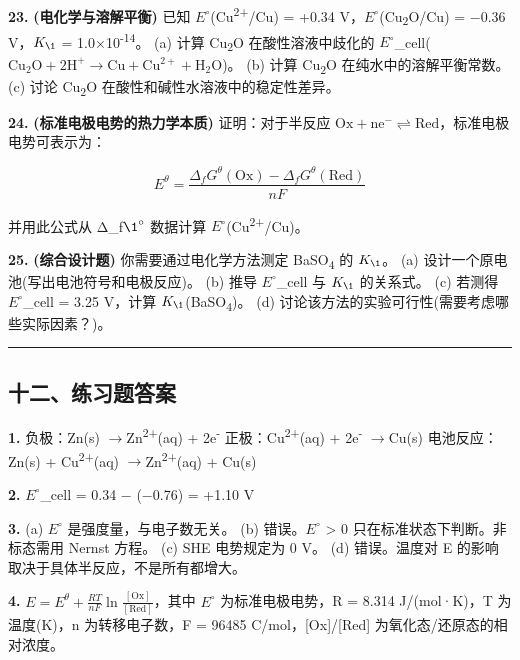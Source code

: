 \documentclass[a4paper,11pt]{ctexart}
\newcommand{\箭}{\ensuremath{\rightarrow}}
\newcommand{\左箭}{\ensuremath{\leftarrow}}
\newcommand{\上箭}{\ensuremath{\uparrow}}
\newcommand{\下箭}{\ensuremath{\downarrow}}
\newcommand{\衡}{\ensuremath{\rightleftharpoons}}
\newcommand{\双箭}{\ensuremath{\leftrightarrow}}
\newcommand{\约等于}{\ensuremath{\approx}}
\newcommand{\小于等于}{\ensuremath{\leq}}
\newcommand{\大于等于}{\ensuremath{\geq}}
\newcommand{\不等于}{\ensuremath{\neq}}
\newcommand{\西格马}{\ensuremath{\sigma}}
\newcommand{\派}{\ensuremath{\pi}}
\begin{document}
\textbf{23.} \textbf{(电化学与溶解平衡)} 已知 \(E^{\circ}\)(Cu\textsuperscript{2+}/Cu) = +0.34 V，\(E^{\circ}\)(Cu\textsubscript{2}O/Cu) = −0.36 V，\(K_{\1}\) = 1.0×10\textsuperscript{-14}。
(a) 计算 Cu\textsubscript{2}O 在酸性溶液中歧化的 \(E^{\circ}\)\_cell(\(\mathrm{Cu_2O + 2H^+ \to Cu + Cu^{2+} + H_2O}\))。
(b) 计算 Cu\textsubscript{2}O 在纯水中的溶解平衡常数。
(c) 讨论 Cu\textsubscript{2}O 在酸性和碱性水溶液中的稳定性差异。

\textbf{24.} \textbf{(标准电极电势的热力学本质)} 证明：对于半反应 \(\mathrm{Ox + ne^- \rightleftharpoons Red}\)，标准电极电势可表示为：

\[E^\theta = \frac{\Delta_f G^\theta(\mathrm{Ox}) - \Delta_f G^\theta(\mathrm{Red})}{nF}\]

并用此公式从 Δ\_f\(\1^{\circ}\) 数据计算 \(E^{\circ}\)(Cu\textsuperscript{2+}/Cu)。

\textbf{25.} \textbf{(综合设计题)} 你需要通过电化学方法测定 BaSO\textsubscript{4} 的 \(K_{\1}\)。
(a) 设计一个原电池(写出电池符号和电极反应)。
(b) 推导 \(E^{\circ}\)\_cell 与 \(K_{\1}\) 的关系式。
(c) 若测得 \(E^{\circ}\)\_cell = 3.25 V，计算 \(K_{\1}\)(BaSO\textsubscript{4})。
(d) 讨论该方法的实验可行性(需要考虑哪些实际因素？)。

\begin{center}\rule{0.5\linewidth}{0.5pt}\end{center}

\subsection{十二、练习题答案}\label{ux5341ux4e8cux7ec3ux4e60ux9898ux7b54ux6848}

\textbf{1.}
负极：Zn(s) \箭 Zn\textsuperscript{2+}(aq) + 2e\textsuperscript{-}
正极：Cu\textsuperscript{2+}(aq) + 2e\textsuperscript{-} \箭 Cu(s)
电池反应：Zn(s) + Cu\textsuperscript{2+}(aq) \箭 Zn\textsuperscript{2+}(aq) + Cu(s)

\textbf{2.} \(E^{\circ}\)\_cell = 0.34 − (−0.76) = +1.10 V

\textbf{3.}
(a) \(E^{\circ}\) 是强度量，与电子数无关。
(b) 错误。\(E^{\circ}\) \textgreater{} 0 只在标准状态下判断。非标态需用 Nernst 方程。
(c) SHE 电势规定为 0 V。
(d) 错误。温度对 E 的影响取决于具体半反应，不是所有都增大。

\textbf{4.} \(E = E^\theta + \frac{RT}{nF}\ln\frac{[\mathrm{Ox}]}{[\mathrm{Red}]}\)，其中 \(E^{\circ}\) 为标准电极电势，R = 8.314 J/(mol·K)，T 为温度(K)，n 为转移电子数，F = 96485 C/mol，{[}Ox{]}/{[}Red{]} 为氧化态/还原态的相对浓度。
\end{document}
